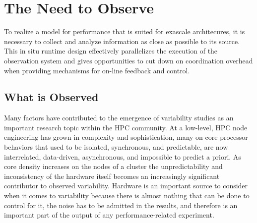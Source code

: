 
\section{The Need to Observe}
To realize a model for performance that is suited for exascale
architecures, it is necessary to collect and analyze information as
close as possible to its source. This in situ runtime design
effectively parallelizes the execution of the observation
system and gives opportunities to cut down on coordination
overhead when providing mechanisms for on-line feedback and control.


\subsection{What is Observed}
Many factors have contributed to the emergence of variability studies
as an important research topic within the HPC community. At a
low-level, HPC node engineering has grown in complexity and
sophistication, many on-core processor behaviors that used to be
isolated, synchronous, and predictable, are now interrelated,
data-driven, asynchronous, and impossible to predict a priori. As core
density increases on the nodes of a cluster the unpredictability and
inconsistency of the hardware itself becomes an increasingly
significant contributor to observed variability. Hardware is an
important source to consider when it comes to variability because
there is almost nothing that can be done to control for it, the noise
has to be admitted in the results, and therefore is an important part
of the output of any performance-related experiment.

